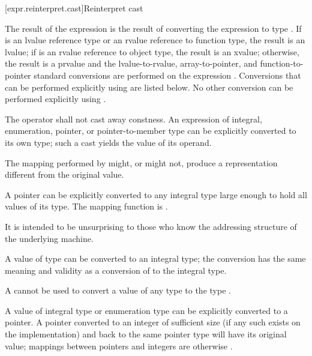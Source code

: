 [expr.reinterpret.cast]{Reinterpret cast}

\pnum
{}%
%
The result of the expression  is the
result of converting the expression  to type .
%
%
If  is an lvalue reference type or an rvalue reference to function type, the result is an lvalue;
if  is an rvalue reference to object type, the result is an xvalue;
otherwise, the result is a prvalue and the
lvalue-to-rvalue, array-to-pointer,
and function-to-pointer standard conversions are
performed on the expression . Conversions that can be performed explicitly
using  are listed below. No other conversion can
be performed explicitly using .

\pnum
The  operator shall not cast away constness.
An expression of integral, enumeration, pointer, or pointer-to-member type
can be explicitly converted to its own type; such a cast yields the value of
its operand.

\pnum
\begin{note}
The mapping performed by  might, or might not, produce a
representation different from the original value.
\end{note}

\pnum
{}%
%
A pointer can be explicitly converted to any integral type large enough
to hold all values of its type.
%
The mapping function is .
\begin{note}
It is intended to be unsurprising to those who know the addressing
structure of the underlying machine.
\end{note}
A value of type  can be converted to an integral
type; the conversion has the same meaning and validity as a conversion of
 to the integral type.
\begin{note}
A 
cannot be used to convert a value of any type to the type
.
\end{note}

\pnum
{}%
%
A value of integral type or enumeration type can be explicitly converted
to a pointer. A pointer converted to an integer of sufficient size (if
any such exists on the implementation) and back to the same pointer type
will have its original value;
%
mappings between pointers and integers are otherwise
.

